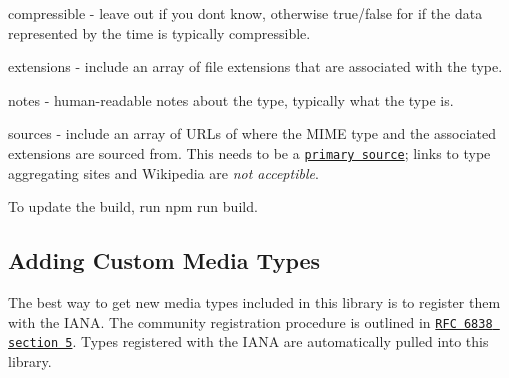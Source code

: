 \begin{DoxyItemize}
\item {\ttfamily compressible} -\/ leave out if you don\textquotesingle{}t know, otherwise {\ttfamily true}/{\ttfamily false} for if the data represented by the time is typically compressible.
\item {\ttfamily extensions} -\/ include an array of file extensions that are associated with the type.
\item {\ttfamily notes} -\/ human-\/readable notes about the type, typically what the type is.
\item {\ttfamily sources} -\/ include an array of U\+R\+Ls of where the M\+I\+ME type and the associated extensions are sourced from. This needs to be a \href{https://en.wikipedia.org/wiki/Primary_source}{\tt primary source}; links to type aggregating sites and Wikipedia are {\itshape not acceptible}.
\end{DoxyItemize}

To update the build, run {\ttfamily npm run build}.

\subsection*{Adding Custom Media Types}

The best way to get new media types included in this library is to register them with the I\+A\+NA. The community registration procedure is outlined in \href{http://tools.ietf.org/html/rfc6838#section-5}{\tt R\+FC 6838 section 5}. Types registered with the I\+A\+NA are automatically pulled into this library. 